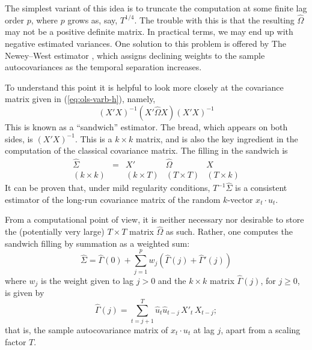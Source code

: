 The simplest variant of this idea is to truncate the computation at
some finite lag order $p$, where $p$ grows as, say, $T^{1/4}$.  The
trouble with this is that the resulting $\hat{\Omega}$ may not be a
positive definite matrix.  In practical terms, we may end up with
negative estimated variances.  One solution to this problem is offered
by The Newey--West estimator \citep{newey-west87}, which assigns
declining weights to the sample autocovariances as the temporal
separation increases.

To understand this point it is helpful to look more closely at the
covariance matrix given in (\ref{eq:ols-varb-h}), namely,
%
\[
(X'X)^{-1} (X' \hat{\Omega} X) (X'X)^{-1}
\]
%
This is known as a ``sandwich'' estimator.  The bread, which appears
on both sides, is $(X'X)^{-1}$.  This is a $k \times k$ matrix, and is
also the key ingredient in the computation of the classical covariance
matrix.  The filling in the sandwich is
%
\[
\begin{array}{ccccc}
\hat{\Sigma} & = & X' & \hat{\Omega} & X \\
{\scriptstyle (k \times k)} & &
{\scriptstyle (k \times T)} & {\scriptstyle (T \times T)} & 
  {\scriptstyle (T \times k)}
\end{array}
\]
%
It can be proven that, under mild regularity conditions, $T^{-1}
\hat{\Sigma}$ is a consistent estimator of the long-run covariance
matrix of the random $k$-vector $x_t \cdot u_t$.   

From a computational point of view, it is neither necessary nor
desirable to store the (potentially very large) $T \times T$ matrix
$\hat{\Omega}$ as such.  Rather, one computes the sandwich filling by
summation as a weighted sum:
%
\[
\hat{\Sigma} = \hat{\Gamma}(0) + \sum_{j=1}^p w_j 
  \left(\hat{\Gamma}(j) + \hat{\Gamma}'(j) \right)
\]
%
where $w_j$ is the weight given to lag $j > 0$ and the $k \times k$
matrix $\hat{\Gamma}(j)$, for $j \geq 0$, is given by
\[
  \hat{\Gamma}(j) = \sum_{t=j+1}^T \hat{u}_t \hat{u}_{t-j}\, X'_t\,
  X_{t-j} ;
\]
that is, the sample autocovariance matrix of $x_t \cdot u_t$ at lag
$j$, apart from a scaling factor $T$.

